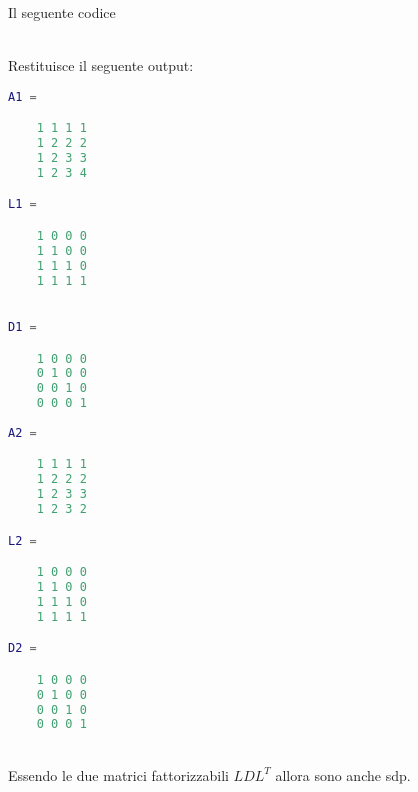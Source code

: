 Il seguente codice



\\

Restituisce il seguente output:

\begin{lstlisting}[language=Matlab, basicstyle = \small]
A1 = 

	1 1 1 1 
	1 2 2 2 
	1 2 3 3 
	1 2 3 4 

L1 = 

	1 0 0 0 
	1 1 0 0 
	1 1 1 0 
	1 1 1 1
	

D1 = 

	1 0 0 0 
	0 1 0 0 
	0 0 1 0 
	0 0 0 1
	
A2 = 

	1 1 1 1 
	1 2 2 2 
	1 2 3 3 
	1 2 3 2 

L2 = 

	1 0 0 0 
	1 1 0 0 
	1 1 1 0 
	1 1 1 1 

D2 = 

	1 0 0 0 
	0 1 0 0 
	0 0 1 0 
	0 0 0 1

\end{lstlisting}

\\

Essendo le due matrici fattorizzabili $LDL^T$ allora sono anche sdp.
